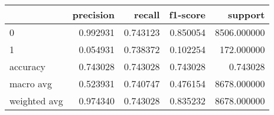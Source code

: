 \begin{tabular}{lrrrr}
\toprule
{} &  precision &    recall &  f1-score &      support \\
\midrule
0            &   0.992931 &  0.743123 &  0.850054 &  8506.000000 \\
1            &   0.054931 &  0.738372 &  0.102254 &   172.000000 \\
accuracy     &   0.743028 &  0.743028 &  0.743028 &     0.743028 \\
macro avg    &   0.523931 &  0.740747 &  0.476154 &  8678.000000 \\
weighted avg &   0.974340 &  0.743028 &  0.835232 &  8678.000000 \\
\bottomrule
\end{tabular}

